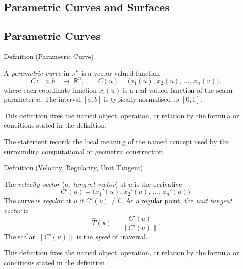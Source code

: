 
\subsection{Parametric Curves and Surfaces}


\subsection*{Parametric Curves}

\begin{definitionbox}{Definition (Parametric Curve)}
\begin{definition}
\label{def:parametric-curve}
A \emph{parametric curve} in $\mathbb{R}^n$ is a vector-valued function
\[
  C\,:\,[a,b]\;\to\;\mathbb{R}^n, \qquad
  C(u) = \bigl(x_1(u),\,x_2(u),\,\ldots,\,x_n(u)\bigr),
\]
where each coordinate function $x_i(u)$ is a real-valued function
of the scalar parameter $u$.
The interval $[a,b]$ is typically normalised to $[0,1]$.
\end{definition}
\end{definitionbox}
\begin{remark*}
This definition fixes the named object, operation, or relation by the formula
or conditions stated in the definition.
\end{remark*}

\begin{remark*}[Interpretation]
The statement records the local meaning of the named concept used by the
surrounding computational or geometric construction.
\end{remark*}

\DefinitionalRoot

\begin{definitionbox}{Definition (Velocity, Regularity, Unit Tangent)}
\begin{definition}
\label{def:velocity-regularity-unit-tangent}
The \emph{velocity vector} (or \emph{tangent vector}) at $u$ is the derivative
\[
  C'(u) = \bigl(x_1'(u),\,x_2'(u),\,\ldots,\,x_n'(u)\bigr).
\]
The curve is \emph{regular} at $u$ if $C'(u) \neq \mathbf{0}$.
At a regular point, the \emph{unit tangent vector} is
\[
  \hat{T}(u) = \frac{C'(u)}{\|C'(u)\|}.
\]
The scalar $\|C'(u)\|$ is the \emph{speed} of traversal.
\end{definition}
\end{definitionbox}
\begin{remark*}
This definition fixes the named object, operation, or relation by the formula
or conditions stated in the definition.
\end{remark*}

